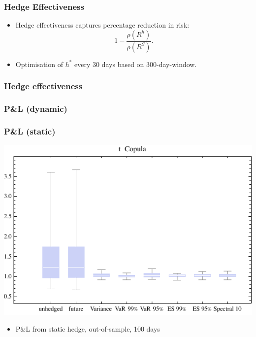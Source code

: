 \documentclass[10pt,mathserif,notes=show]{beamer}
\renewcommand{\(}{\begin{columns}}
\renewcommand{\)}{\end{columns}}
\newcommand{\<}[1]{\begin{column}{#1}}
\renewcommand{\>}{\end{column}}
\theoremstyle{definition}
\begin{document}

\begin{frame}
  \frametitle{Hedge Effectiveness}
  \begin{itemize}
  \item Hedge effectiveness \citep{Ederington1979} captures percentage
    reduction in risk:
    \begin{equation*}
      1- \frac{\rho(R^h)}{\rho(R^S)}.
    \end{equation*}
  \item Optimisation of $h^\ast$ every 30 days based on
    300-day-window. 
  \end{itemize}
\end{frame}

\begin{frame}
  \frametitle{Hedge effectiveness}
  
\end{frame}

\begin{frame}
  \frametitle{P\&L (dynamic)}
  
\end{frame}

\begin{frame}
  \frametitle{P\&L (static)}
  \begin{center}
    \includegraphics[scale=0.85]{../_pics/PL_static_out_tcop.pdf}    
  \end{center}
  \begin{itemize}
  \item P\&L from static hedge, out-of-sample, 100 days
  \end{itemize}
\end{frame}
\end{document}
